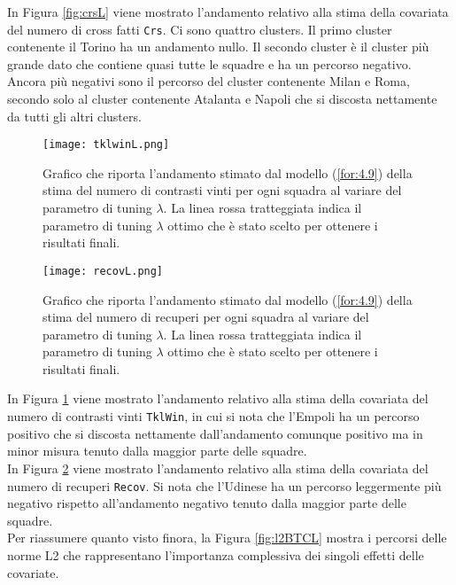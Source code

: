 In Figura \ref{fig:crsL} viene mostrato l'andamento relativo alla stima della covariata del numero di cross fatti \texttt{Crs}. Ci sono quattro clusters. Il primo cluster contenente il Torino ha un andamento nullo. Il secondo cluster è il cluster più grande dato che contiene quasi tutte le squadre e ha un percorso negativo. Ancora più negativi sono il percorso del cluster contenente Milan e Roma, secondo solo al cluster contenente Atalanta e Napoli che si discosta nettamente da tutti gli altri clusters.

\begin{figure}[htbp]
	\begin{center}
		\texttt{[image: tklwinL.png]}
		\caption{Grafico che riporta l'andamento stimato dal modello (\ref{for:4.9}) della stima del numero di contrasti vinti per ogni squadra al variare del parametro di tuning $\lambda$. La linea rossa tratteggiata indica il parametro di tuning $\lambda$ ottimo che è stato scelto per ottenere i risultati finali.} \label{fig:tklwinL}
	\end{center}
\end{figure}

\begin{figure}[htbp]
	\begin{center}
		\texttt{[image: recovL.png]}
		\caption{Grafico che riporta l'andamento stimato dal modello (\ref{for:4.9}) della stima del numero di recuperi per ogni squadra al variare del parametro di tuning $\lambda$. La linea rossa tratteggiata indica il parametro di tuning $\lambda$ ottimo che è stato scelto per ottenere i risultati finali.} \label{fig:recovL}
	\end{center}
\end{figure}
In Figura \ref{fig:tklwinL} viene mostrato l'andamento relativo alla stima della covariata del numero di contrasti vinti \texttt{TklWin}, in cui si nota che l'Empoli ha un percorso positivo che si discosta nettamente dall'andamento comunque positivo ma in minor misura tenuto dalla maggior parte delle squadre.\\
In Figura \ref{fig:recovL} viene mostrato l'andamento relativo alla stima della covariata del numero di recuperi \texttt{Recov}. Si nota che l'Udinese ha un percorso leggermente più negativo rispetto all'andamento negativo tenuto dalla maggior parte delle squadre.\\

Per riassumere quanto visto finora, la Figura \ref{fig:l2BTCL} mostra i percorsi delle norme L2 che rappresentano l'importanza complessiva dei singoli effetti delle covariate.

